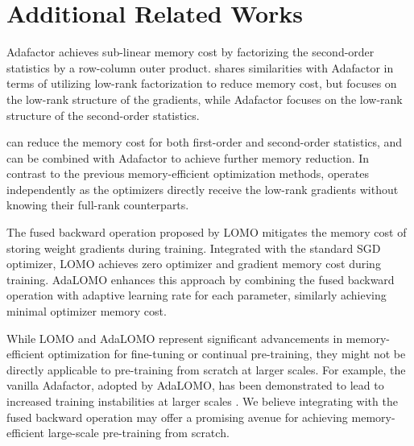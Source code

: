 \section{Additional Related Works}

Adafactor \citep{shazeerAdafactorAdaptiveLearning} achieves sub-linear memory cost by factorizing the second-order statistics by a row-column outer product.
\lowrank{} shares similarities with Adafactor in terms of utilizing low-rank factorization to reduce memory cost, but \lowrank{} focuses on the low-rank structure of the gradients, while Adafactor focuses on the low-rank structure of the second-order statistics.

\lowrank{} can reduce the memory cost for both first-order and second-order statistics, and can be combined with Adafactor to achieve further memory reduction. 
In contrast to the previous memory-efficient optimization methods, \lowrank{} operates independently as the optimizers directly receive the low-rank gradients without knowing their full-rank counterparts.

The fused backward operation proposed by LOMO \citep{lvFullParameterFinetuning2023} mitigates the memory cost of storing weight gradients during training.
Integrated with the standard SGD optimizer, LOMO achieves zero optimizer and gradient memory cost during training.
AdaLOMO \citep{lvAdaLomoLowmemoryOptimization2023} enhances this approach by combining the fused backward operation with adaptive learning rate for each parameter, similarly achieving minimal optimizer memory cost.

While LOMO and AdaLOMO represent significant advancements in memory-efficient optimization for fine-tuning or continual pre-training, they might not be directly applicable to pre-training from scratch at larger scales.
For example, the vanilla Adafactor, adopted by AdaLOMO, has been demonstrated to lead to increased training instabilities at larger scales \citep{raeScalingLanguageModels2022,chowdheryPaLMScalingLanguage2022,wortsmanStableLowprecisionTraining,zhaiScalingVisionTransformers2022}.
We believe integrating \lowrank{} with the fused backward operation may offer a promising avenue for achieving memory-efficient large-scale pre-training from scratch.